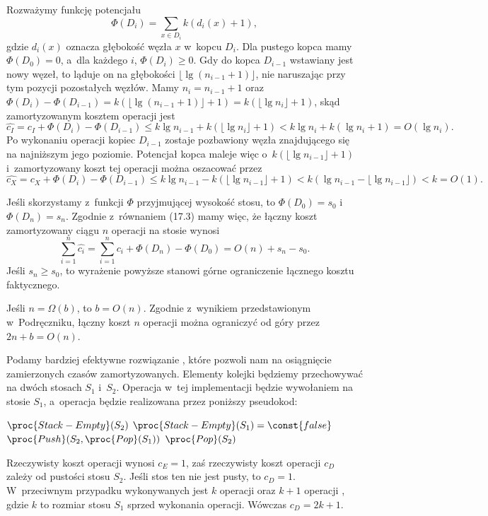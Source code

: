 Rozważymy funkcję potencjału
\[
	\Phi(D_i) = \sum_{x\in D_i}k(d_i(x)+1),
\]
gdzie $d_i(x)$ oznacza głębokość węzła $x$ w~kopcu $D_i$.
Dla pustego kopca mamy $\Phi(D_0)=0$, a~dla każdego $i$, $\Phi(D_i)\ge0$.
Gdy do kopca $D_{i-1}$ wstawiany jest nowy węzeł, to ląduje on na głębokości $\lfloor\lg(n_{i-1}+1)\rfloor$, nie naruszając przy tym pozycji pozostałych węzłów.
Mamy $n_i=n_{i-1}+1$ oraz $\Phi(D_i)-\Phi(D_{i-1})=k(\lfloor\lg(n_{i-1}+1)\rfloor+1)=k(\lfloor\lg n_i\rfloor+1)$, skąd zamortyzowanym kosztem operacji  jest
\[
	\widehat{c_I} = c_I+\Phi(D_i)-\Phi(D_{i-1}) \le k\lg n_{i-1}+k(\lfloor\lg n_i\rfloor+1) < k\lg n_i+k(\lg n_i+1) = O(\lg n_i).
\]
Po wykonaniu operacji  kopiec $D_{i-1}$ zostaje pozbawiony węzła znajdującego się na najniższym jego poziomie.
Potencjał kopca maleje więc o~$k(\lfloor\lg n_{i-1}\rfloor+1)$ i~zamortyzowany koszt tej operacji można oszacować przez
\[
	\widehat{c_X} = c_X+\Phi(D_i)-\Phi(D_{i-1}) \le k\lg n_{i-1}-k(\lfloor\lg n_{i-1}\rfloor+1) < k(\lg n_{i-1}-\lfloor\lg n_{i-1}\rfloor) < k = O(1).
\]

\exercise %
Jeśli skorzystamy z~funkcji $\Phi$ przyjmującej wysokość stosu, to $\Phi(D_0)=s_0$ i~$\Phi(D_n)=s_n$.
Zgodnie z~równaniem (17.3) mamy więc, że łączny koszt zamortyzowany ciągu $n$ operacji na stosie wynosi \[
	\sum_{i=1}^n\widehat{c_i} = \sum_{i=1}^nc_i+\Phi(D_n)-\Phi(D_0) = O(n)+s_n-s_0.
\]
Jeśli $s_n\ge s_0$, to wyrażenie powyższe stanowi górne ograniczenie łącznego kosztu faktycznego.

\exercise %
Jeśli $n=\Omega(b)$, to $b=O(n)$.
Zgodnie z~wynikiem przedstawionym w~Podręczniku, łączny koszt $n$ operacji  można ograniczyć od góry przez $2n+b=O(n)$.

\exercise %
Podamy bardziej efektywne rozwiązanie , które pozwoli nam na osiągnięcie zamierzonych czasów zamortyzowanych.
Elementy kolejki będziemy przechowywać na dwóch stosach $S_1$ i~$S_2$.
Operacja  w~tej implementacji będzie wywołaniem  na stosie $S_1$, a~operacja  będzie realizowana przez poniższy pseudokod:
\begin{codebox}
\li	\If $\proc{Stack-Empty}(S_2)$
\li		\Then \While $\proc{Stack-Empty}(S_1)=\const{false}$
\li				\Do $\proc{Push}(S_2,\proc{Pop}(S_1))$
				\End
		\End
\li	\Return $\proc{Pop}(S_2)$
\end{codebox}
Rzeczywisty koszt operacji  wynosi $c_E=1$, zaś rzeczywisty koszt operacji  $c_D$ zależy od pustości stosu $S_2$.
Jeśli stos ten nie jest pusty, to $c_D=1$.
W~przeciwnym przypadku wykonywanych jest $k$ operacji  oraz $k+1$ operacji , gdzie $k$ to rozmiar stosu $S_1$ sprzed wykonania operacji.
Wówczas $c_D=2k+1$.

